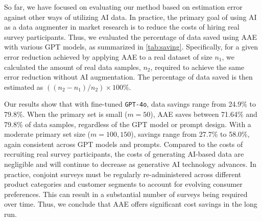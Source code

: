 So far, we have focused on evaluating our method based on estimation error against other ways of utilizing AI data. In practice, the primary goal of using AI as a data augmenter in market research is to reduce the costs of hiring real survey participants. Thus, we evaluated the percentage of data saved using AAE with various GPT models, as summarized in \cref{tab:saving}. Specifically, for a given error reduction achieved by applying AAE to a real dataset of size $n_1$, we calculated the amount of real data samples, $n_2$, required to achieve the same error reduction without AI augmentation. The percentage of data saved is then estimated as $((n_2 - n_1)/n_2) \times 100\%$.

Our results show that with fine-tuned \texttt{GPT-4o}, data savings range from 24.9\% to 79.8\%. When the primary set is small ($m=50$), AAE saves between 71.64\% and 79.8\% of data samples, regardless of the GPT model or prompt design. With a moderate primary set size ($m=100, 150$), savings range from 27.7\% to 58.0\%, again consistent across GPT models and prompts. Compared to the costs of recruiting real survey participants, the costs of generating AI-based data are negligible and will continue to decrease as generative AI technology advances. In practice, conjoint surveys must be regularly re-administered across different product categories and customer segments to account for evolving consumer preferences. This can result in a substantial number of surveys being required over time. Thus, we conclude that AAE offers significant cost savings in the long run.








